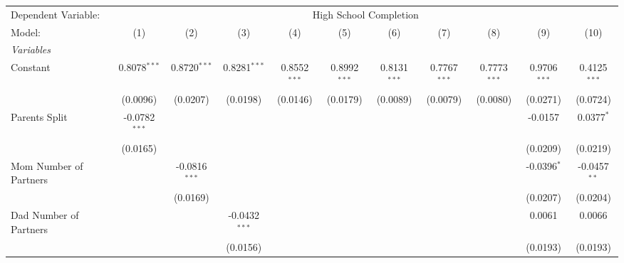 
\begingroup
\centering
\begin{tabular}{lcccccccccc}
   \tabularnewline \midrule \midrule
   Dependent Variable: & \multicolumn{10}{c}{High School Completion}\\
   Model:                                    & (1)             & (2)             & (3)             & (4)             & (5)             & (6)             & (7)                   & (8)                    & (9)             & (10)\\  
   \midrule
   \emph{Variables}\\
   Constant                                  & 0.8078$^{***}$  & 0.8720$^{***}$  & 0.8281$^{***}$  & 0.8552$^{***}$  & 0.8992$^{***}$  & 0.8131$^{***}$  & 0.7767$^{***}$        & 0.7773$^{***}$         & 0.9706$^{***}$  & 0.4125$^{***}$\\   
                                             & (0.0096)        & (0.0207)        & (0.0198)        & (0.0146)        & (0.0179)        & (0.0089)        & (0.0079)              & (0.0080)               & (0.0271)        & (0.0724)\\   
   Parents Split                             & -0.0782$^{***}$ &                 &                 &                 &                 &                 &                       &                        & -0.0157         & 0.0377$^{*}$\\   
                                             & (0.0165)        &                 &                 &                 &                 &                 &                       &                        & (0.0209)        & (0.0219)\\   
   Mom Number of Partners                    &                 & -0.0816$^{***}$ &                 &                 &                 &                 &                       &                        & -0.0396$^{*}$   & -0.0457$^{**}$\\   
                                             &                 & (0.0169)        &                 &                 &                 &                 &                       &                        & (0.0207)        & (0.0204)\\   
   Dad Number of Partners                    &                 &                 & -0.0432$^{***}$ &                 &                 &                 &                       &                        & 0.0061          & 0.0066\\   
                                             &                 &                 & (0.0156)        &                 &                 &                 &                       &                        & (0.0193)        & (0.0193)\\   

\end{tabular}
